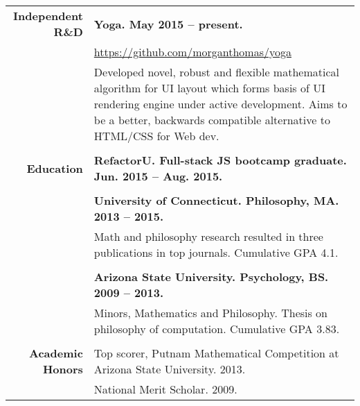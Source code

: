 \documentclass{article}
\begin{document}
\begin{tabular}{rl}
  {\bf Independent R\&D} & {\bf Yoga. May 2015 -- present.} \\ & \href{https://github.com/morganthomas/yoga}{https://github.com/morganthomas/yoga} \\
  & \parbox{4.5in}{Developed novel, robust and flexible mathematical algorithm for UI layout which forms basis of UI rendering engine under active development. Aims to be a better, backwards compatible alternative to HTML/CSS for Web dev.} \\ \\

  {\bf Education} & {\bf RefactorU. Full-stack JS bootcamp graduate. Jun. 2015 -- Aug. 2015.} \\ \\
  & {\bf University of Connecticut. Philosophy, MA. 2013 -- 2015.} \\
  & \parbox{4.5in}{Math and philosophy research resulted in three publications in top journals. Cumulative GPA 4.1.} \\ \\

  & {\bf Arizona State University. Psychology, BS. 2009 -- 2013.} \\
  & \parbox{4.5in}{Minors, Mathematics and Philosophy. Thesis on philosophy of computation. Cumulative GPA 3.83.} \\ \\



  {\bf Academic Honors} & Top scorer, Putnam Mathematical Competition at Arizona State University. 2013. \\
   & National Merit Scholar. 2009.
\end{tabular}
\egroup
\end{document}
